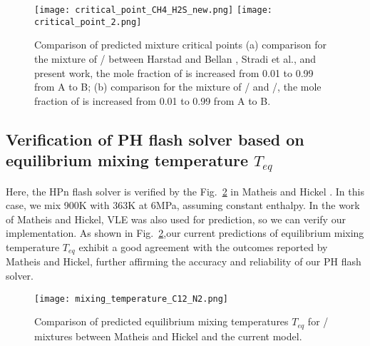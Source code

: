 
    \begin{figure}[htbp]
        \begin{center}
            \texttt{[image: critical\_point\_CH4\_H2S\_new.png]}
            \texttt{[image: critical\_point\_2.png]}
        \end{center}
        \caption{Comparison of predicted mixture critical points (a) comparison for the mixture of / between Harstad and Bellan \cite{harstad2004mixing}, Stradi et al., \cite{stradi2001reliable} and present work, the mole fraction of  is increased from 0.01 to 0.99 from A to B; (b) comparison for the mixture of / and /, the mole fraction of  is increased from 0.01 to 0.99 from A to B.}
        \label{v2_new}
    \end{figure}

    \subsection{Verification of PH flash solver based on equilibrium mixing temperature $T_{eq}$}
 Here, the HPn flash solver is verified by the Fig.~\ref{v6} in Matheis and Hickel \cite{matheis2018multi}. In this case, we mix 900K  with 363K  at 6MPa, assuming constant enthalpy. In the work of Matheis and Hickel\cite{matheis2018multi}, VLE was also used for prediction, so we can verify our implementation. As shown in Fig.~\ref{v6},our current predictions of equilibrium mixing temperature $T_{eq}$ exhibit a good agreement with the outcomes reported by Matheis and Hickel, further affirming the accuracy and reliability of our PH flash solver.

    \begin{figure}[htb]
        \begin{center}
            \texttt{[image: mixing\_temperature\_C12\_N2.png]}
        \end{center}
        \caption{Comparison of predicted equilibrium mixing temperatures $T_{eq}$ for / mixtures between Matheis and Hickel \cite{matheis2018multi} and the current model.}
        \label{v6}
    \end{figure}

